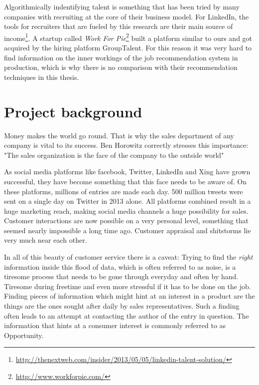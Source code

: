 Algorithmically indentifying talent is something that has been tried by many
companies with recruiting at the core of their business model.
For LinkedIn, the tools for recruiters that are fueled by this research are
their main source of income\footnote{\url{http://thenextweb.com/insider/2013/05/05/linkedin-talent-solution/}}.
A startup called \textit{Work For Pie}\footnote{\url{http://www.workforpie.com/}}
built a platform similar to ours and got acquired by the hiring platform GroupTalent.
For this reason it was very hard to find information on the inner workings of the
job recommendation system in production, which is why there is no comparison with their
recommendation techniques in this thesis.

\section{Project background}
Money makes the world go round. That is why the sales department
of any company is vital to its success. Ben Horowitz correctly
stresses this importance: "The sales organization is the face of the company to the outside world"\cite{bh:2014}

As social media platforms like facebook, Twitter, LinkedIn and Xing
have grown successful, they have become something that this face needs to be aware of.
On these platforms, millions of entries are made each day.
500 million tweets were sent on a single day on Twitter in 2013 alone.
All platforms combined result in a huge marketing reach,
making social media channels a huge possibility for sales.
Customer interactions are now possible on a very personal level,
something that seemed nearly impossible a long time ago.
Customer appraisal and shitstorms lie very much near each other.
\newline

In all of this beauty of customer service there is a caveat:
Trying to find the \textit{right} information inside this
flood of data, which is often referred to as noise, is a tiresome
process that needs to be gone through everyday and often by hand.
Tiresome during freetime and even more stressful if it has to be done on the job.
Finding pieces of information which might hint at an interest
in a product are the things are the ones sought after daily by sales representatives.
Such a finding often leads to an attempt at contacting the author of the
entry in question. The information that hints at a consumer interest is commonly
referred to as Opportunity.

